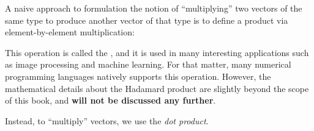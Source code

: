 \documentclass{ximera}
\begin{document}
\begin{warning}
  A naive approach to formulation the notion of ``multiplying'' two
  vectors of the same type to produce another vector of that type is
  to define a product via element-by-element multiplication:
  \begin{center}
  \end{center}
  This operation is called the ,
  and it is used in many interesting applications such as image
  processing and machine learning. For that matter, many numerical
  programming languages natively supports this operation. However, the
  mathematical details about the Hadamard product are slightly beyond
  the scope of this book, and \textbf{will not be discussed any further}.
\end{warning}
 Instead, to ``multiply'' vectors, we use the \textit{dot product}.
\end{document}

